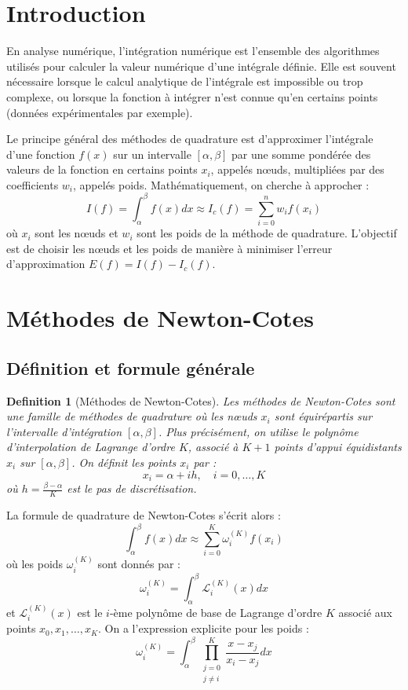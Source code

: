 \documentclass{article}
\newtheorem{definition}{Definition}
\begin{document}
\sloppy

\section{Introduction}

En analyse numérique, l'intégration numérique est l'ensemble des algorithmes utilisés pour calculer la valeur numérique d'une intégrale définie. Elle est souvent nécessaire lorsque le calcul analytique de l'intégrale est impossible ou trop complexe, ou lorsque la fonction à intégrer n'est connue qu'en certains points (données expérimentales par exemple).

Le principe général des méthodes de quadrature est d'approximer l'intégrale d'une fonction $f(x)$ sur un intervalle $[\alpha, \beta]$ par une somme pondérée des valeurs de la fonction en certains points $x_i$, appelés nœuds, multipliées par des coefficients $w_i$, appelés poids.  Mathématiquement, on cherche à approcher :
\[
I(f) = \int_{\alpha}^{\beta} f(x) dx \approx I_c(f) = \sum_{i=0}^{n} w_i f(x_i)
\]
où $x_i$ sont les nœuds et $w_i$ sont les poids de la méthode de quadrature. L'objectif est de choisir les nœuds et les poids de manière à minimiser l'erreur d'approximation $E(f) = I(f) - I_c(f)$.

\section{Méthodes de Newton-Cotes}

\subsection{Définition et formule générale}

\begin{definition}[Méthodes de Newton-Cotes]
Les méthodes de Newton-Cotes sont une famille de méthodes de quadrature où les nœuds $x_i$ sont équirépartis sur l'intervalle d'intégration $[\alpha, \beta]$. Plus précisément, on utilise le polynôme d'interpolation de Lagrange d'ordre $K$, associé à $K+1$ points d'appui équidistants $x_i$ sur $[\alpha, \beta]$.
On définit les points $x_i$ par :
\[
x_i = \alpha + i h, \quad i = 0, \dots, K
\]
où $h = \frac{\beta - \alpha}{K}$ est le pas de discrétisation.
\end{definition}

La formule de quadrature de Newton-Cotes s'écrit alors :
\[
\int_{\alpha}^{\beta} f(x) dx \approx \sum_{i=0}^{K} \omega_i^{(K)} f(x_i)
\]
où les poids $\omega_i^{(K)}$ sont donnés par :
\[
\omega_i^{(K)} = \int_{\alpha}^{\beta} \mathcal{L}_i^{(K)}(x) dx
\]
et $\mathcal{L}_i^{(K)}(x)$ est le $i$-ème polynôme de base de Lagrange d'ordre $K$ associé aux points $x_0, x_1, \dots, x_K$. On a l'expression explicite pour les poids :
\[
\omega_i^{(K)} = \int_{\alpha}^{\beta} \prod_{\substack{j=0 \\ j \neq i}}^{K} \frac{x-x_j}{x_i-x_j} dx
\]
\end{document}
